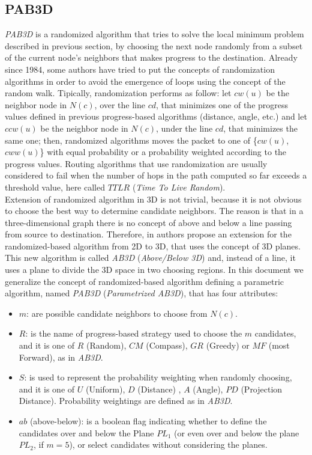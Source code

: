 \documentclass[journal,comsoc]{IEEEtran}
\begin{document}
\subsection{PAB3D}
\emph{PAB3D} is a randomized algorithm that tries to solve the local minimum problem described in previous section, by choosing the next node randomly from a subset of the current node's neighbors that makes progress to the destination. Already since 1984, some authors have tried to put the concepts of randomization algorithms in order to avoid the emergence of loops \cite{nelson:random, bose:compass, fevens:abface} using the concept of the random walk. Tipically, randomization performs as follow: let \(cw(u)\) be the neighbor node in \(N(c)\), over the line \(cd\), that minimizes one of the progress values defined in previous progress-based algorithms (distance, angle, etc.) and let \(ccw(u)\) be the neighbor node in \(N(c)\), under the line \(cd\), that minimizes the same one; then, randomized algorithms moves the packet to one of \{\(cw(u)\), \(cww(u)\)\} with equal probability or a probability weighted according to the progress values. Routing algorithms that use randomization are usually considered to fail when the number of hops in the path computed so far exceeds a threshold value, here called \(TTLR\) (\emph{Time To Live Random}).\\
Extension of randomized algorithm in 3D is not trivial, because it is not obvious to choose the best way to determine candidate neighbors. The reason is that in a three-dimensional graph there is no concept of above and below a line passing from source to destination. Therefore, in \cite{abdallah:random} authors propose an extension for the randomized-based algorithm from 2D to 3D, that uses the concept of 3D planes. This new algorithm is called \emph{AB3D} (\emph{Above/Below 3D}) and, instead of a line, it uses a plane to divide the 3D space in two choosing regions. In this document we generalize the concept of randomized-based algorithm defining a parametric algorithm, named \emph{PAB3D} (\emph{Parametrized AB3D}), that has four attributes:
\begin{itemize}
\item \(m\): are possible candidate neighbors to choose from \(N(c)\).
\item \(R\): is the name of progress-based strategy used to choose the \(m\) candidates, and it is one of \(R\) (Random), \(CM\) (Compass), \(GR\) (Greedy) or \(MF\) (most Forward), as in \emph{AB3D}.
\item \(S\): is used to represent the probability weighting when randomly choosing, and it is one of \(U\) (Uniform), \(D\) (Distance) , \(A\) (Angle), \(PD\) (Projection Distance). Probability weightings are defined as in \emph{AB3D}.
\item \(ab\) (above-below): is a boolean flag indicating whether to define the candidates over and below the Plane \(PL_1\) (or even over and below the plane \(PL_2\), if \(m = 5\)), or select candidates without considering the planes.
\end{itemize}
\end{document}
